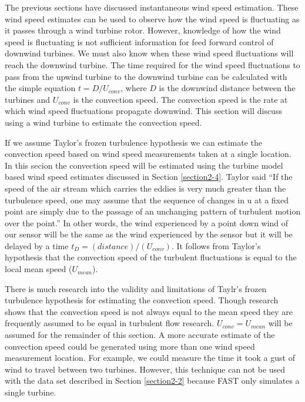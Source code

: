 The previous sections have discussed instantaneous wind speed estimation. These wind speed estimates can be used to observe how the wind speed is fluctuating as it passes through a wind turbine rotor. However, knowledge of how the wind speed is fluctuating is not sufficient information for feed forward control of downwind turbines. We must also know when these wind speed fluctuations will reach the downwind turbine. The time required for the wind speed fluctuations to pass from the upwind turbine to the downwind turbine can be calculated with the simple equation $t = D/U_{conv}$, where $D$ is the downwind distance between the turbines and $U_{conv}$ is the convection speed. The convection speed is the rate at which wind speed fluctuations propagate downwind. This section will discuss using a wind turbine to estimate the convection speed.

If we assume Taylor's frozen turbulence hypothesis we can estimate the convection speed based on wind speed measurements taken at a single location. In this secion the convection speed will be estimated using the turbine model based wind speed estimates discussed in Section \ref{section2-4}. Taylor said ``If the speed of the air stream which carries the eddies is very much greater than the turbulence speed, one may assume that the sequence of changes in u at a fixed point are simply due to the passage of an unchanging pattern of turbulent motion over the point.''\cite{taylor1938} In other words, the wind experienced by a point down wind of our sensor will be the same as the wind experienced by the sensor but it will be delayed by a time $t_D = (distance)/(U_{conv})$. It follows from Taylor's hypothesis that the convection speed of the turbulent fluctuations is equal to the local mean speed ($U_{mean}$). 

There is much research into the validity and limitations of Taylr's frozen turbulence hypothesis for estimating the convection speed.\cite{dennis2008,goldschmidt1981,delalamo2009,atkinson2015} Though research shows that the convection speed is not always equal to the mean speed they are frequently assumed to be equal in turbulent flow research. $U_{conv} = U_{mean}$ will be assumed for the remainder of this section. A more accurate estimate of the convection speed could be generated using more than one wind speed measurement location. For example, we could measure the time it took a gust of wind to travel between two turbines. However, this technique can not be used with the data set described in Section \ref{section2-2} because FAST only simulates a single turbine.

